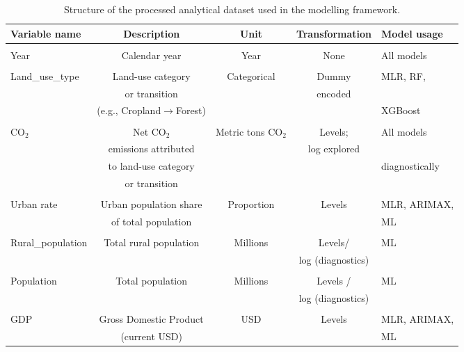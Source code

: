 \documentclass[10pt,letterpaper]{article}
\begin{document}
\begin{table}[h!]
	\centering
	\caption{Structure of the processed analytical dataset used in the modelling framework.}
	\label{tab:dataset_schema}
	\begin{tabular}{lcccl}
		\hline
		\textbf{Variable name} & \textbf{Description} & \textbf{Unit} & \textbf{Transformation} & \textbf{Model usage} \\ 
		\hline
		&&&&\\
	
		Year & Calendar year & Year & None & All models \\&&&&\\
	
		Land\_use\_type & Land-use category  & Categorical & Dummy & MLR, RF,  \\&or transition &&encoded&\\ &(e.g., Cropland$\rightarrow$Forest)&&&XGBoost\\&&&&\\
	
		CO$_2$\ & Net CO$_2$  & Metric tons CO$_2$ & Levels; & All models \\ &emissions attributed &&log explored&\\&to land-use category &&  &diagnostically\\&or transition&&&\\&&&&\\
	
		Urban rate & Urban population share  & Proportion & Levels & MLR, ARIMAX, \\ &of total population&&& ML\\&&&&\\
		
		Rural\_population & Total rural population & Millions & Levels/  & ML \\ &&& log (diagnostics)&\\&&&&\\
	
		Population & Total population & Millions & Levels /  & ML \\&&&log (diagnostics)&\\ &&&&\\
	
		GDP & Gross Domestic Product  & USD & Levels & MLR, ARIMAX, \\ &(current USD)&&& ML\\
		\hline
	\end{tabular}
	
\end{table}
\end{document}
